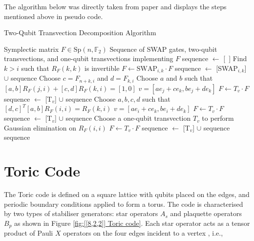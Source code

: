 \documentclass[12pt, a4paper]{report}
\begin{document}
\begin{appendices}
The algorithm below was directly taken from paper \cite{volanto2023minimizing} and displays the steps mentioned above in pseudo code.

\begin{algorithm}
\caption{Two-Qubit Transvection Decomposition Algorithm}
\label{alg:two_qubit_transvection}
\begin{algorithmic}[1]
\Require Symplectic matrix $F \in \text{Sp}(n, \mathbb{F}_2)$
\Ensure Sequence of SWAP gates, two-qubit transvections, and one-qubit transvections implementing $F$
\State sequence $\gets$ [\ ]
        \State Find $k > i$ such that $R_F(k,k)$ is invertible
        \State $F \gets \text{SWAP}_{i,k} \cdot F$
        \State sequence $\gets$ [SWAP$_{i,k}$] $\cup$ sequence
    \EndIf
        \State Choose $c = F_{n+k,i}$ and $d = F_{k,i}$
        \State Choose $a$ and $b$ such that $[a,b] R_F(j,i) + [c,d] R_F(k,i) = [1,0]$
        \State $v = [a e_j + c e_k, b e_j + d e_k]$
        \State $F \gets T_v \cdot F$
        \State sequence $\gets$ [T$_v$] $\cup$ sequence
    \EndWhile
            \State Choose $a,b,c,d$ such that $[d,c]^T [a,b] R_F(i,i) = R_F(k,i)$
            \State $v = [a e_i + c e_k, b e_i + d e_k]$
            \State $F \gets T_v \cdot F$
            \State sequence $\gets$ [T$_v$] $\cup$ sequence
        \EndIf
    \EndFor
        \State Choose a one-qubit transvection $T_v$ to perform Gaussian elimination on $R_F(i,i)$
        \State $F \gets T_v \cdot F$
        \State sequence $\gets$ [T$_v$] $\cup$ sequence
    \EndWhile
\EndFor
\State \Return sequence
\end{algorithmic}
\end{algorithm}


\chapter{Toric Code} \label{Appendix C}
The Toric code is defined on a square lattice with qubits placed on the edges, and periodic boundary conditions applied to form a torus. The code is characterised by two types of stabiliser generators: star operators \(A_s\)  and plaquette operators \(B_p\) as shown in Figure \ref{fig:[[8,2,2]] Toric code}. Each star operator acts as a tensor product of Pauli \(X\) operators on the four edges incident to a vertex \cite{bombin2013introduction}, i.e.,


\end{appendices}
\end{document}
